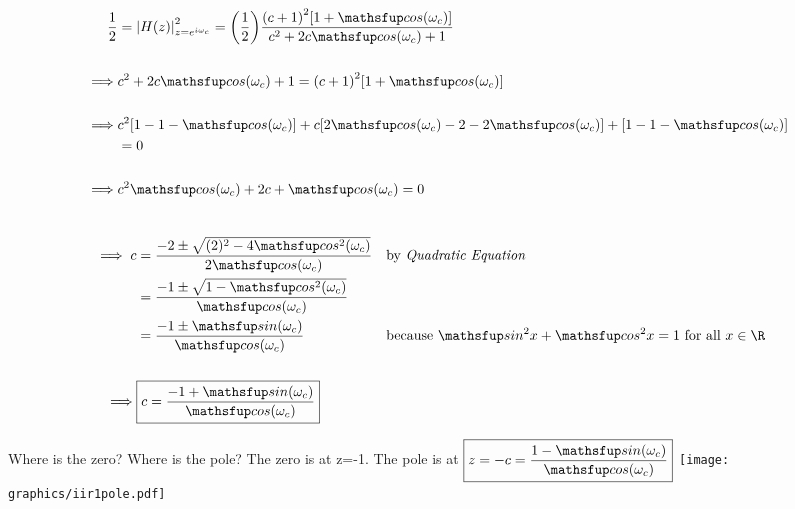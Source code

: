 {\begin{align*}
  \frac{1}{2}
    &= \abs{H(z)}^2_{z=e^{i\omega_c}}
     = \brp{\frac{1}{2}}
       \frac{\brp{c+1}^2\brs{1 +  \cos\brp{\omega_c}}}
            {c^2 + 2 c\cos\brp{\omega_c} + 1} 
  \\\\\implies &c^2 + 2 c\cos\brp{\omega_c} + 1 
             = \brp{c+1}^2\brs{1 +  \cos\brp{\omega_c}}
  \\\\\implies & c^2\brs{1-1-\cos\brp{\omega_c}} 
             + c  \brs{2\cos\brp{\omega_c}-2-2\cos\brp{\omega_c}}
             +    \brs{1-1-\cos\brp{\omega_c}}
             \\&= 0
  \\\\\implies & c^2{\cos\brp{\omega_c}} 
             + 2c
             +    {\cos\brp{\omega_c}}
             = 0
\end{align*}}
\mbox{}\vfill\mbox{}

\newpage\mbox{}\vfill
{\begin{align*}
  \\\implies c &= \frac{-2 \pm \sqrt{(2)^2 -4\cos^2\brp{\omega_c}}}
                       {2\cos\brp{\omega_c}}
               && \text{by \thme{Quadratic Equation}}
             \\&= \frac{-1 \pm \sqrt{1 -\cos^2\brp{\omega_c}}}
                       {\cos\brp{\omega_c}}
             \\&= \frac{-1 \pm \sin\brp{\omega_c}}
                       {\cos\brp{\omega_c}}
               && \text{because $\sin^2x + \cos^2x = 1$ for all $x\in\R$}
  \\
  \\\implies &\ds\boxed{c = \frac{-1 + \sin\brp{\omega_c}}
                    {\cos\brp{\omega_c}}}
\end{align*}}
\vfill\mbox{}


\newpage
Where is the zero? Where is the pole?
\vfill
The zero is at z=-1. \qquad The pole is at 
$\ds\boxed{z=-c = \frac{1 - \sin\brp{\omega_c}}
                    {\cos\brp{\omega_c}}}$
\vfill
\texttt{[image: graphics/iir1pole.pdf]}
\vfill\mbox{}

